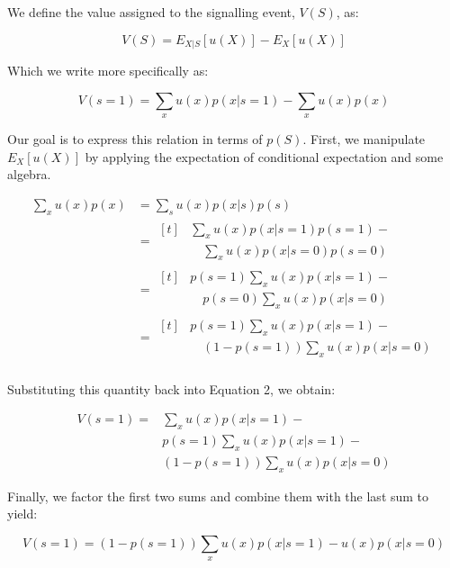 \documentclass[9pt,twocolumn,twoside,]{pnas-new}
\begin{document}
{We define the value assigned to the signalling event, \(V(S)\), as:

\begin{equation}
V(S) = E_{X|S}[u(X)] - E_X[u(X)]
\end{equation}

Which we write more specifically as:

\begin{equation}
V(s=1) = \sum_x u(x)p(x|s=1) - \sum_x u(x)p(x)
\end{equation}

Our goal is to express this relation in terms of \(p(S)\). First, we
manipulate \(E_X[u(X)]\) by applying the expectation of conditional
expectation and some algebra.

\begin{align*}
\sum_x u(x)p(x) & = \sum_s u(x)p(x|s)p(s) \\
 &= \begin{aligned}[t]
    & \sum_x u(x)p(x|s=1)p(s=1) - \\
    & \quad \sum_x u(x)p(x|s=0)p(s=0) \end{aligned}\\
 &= \begin{aligned}[t]
    & p(s=1)\sum_x u(x)p(x|s=1) -\\
    & \quad p(s=0) \sum_x u(x)p(x|s=0) \end{aligned}\\
 &= \begin{aligned}[t]
    & p(s=1)\sum_x u(x)p(x|s=1) - \\
    & \quad (1-p(s=1)) \sum_x u(x)p(x|s=0) \end{aligned}\\
\end{align*}

Substituting this quantity back into Equation 2, we obtain:

\begin{align*}
V(s=1) = & \sum_x u(x)p(x|s=1) - \\ & p(s=1)\sum_x u(x)p(x|s=1) -\\ & (1-p(s=1)) \sum_x u(x)p(x|s=0)
\end{align*}

Finally, we factor the first two sums and combine them with the last sum
to yield:

\begin{equation}
V(s=1)=(1-p(s=1))\sum_x u(x)p(x|s=1) - u(x)p(x|s=0)
\end{equation}

}
\end{document}

